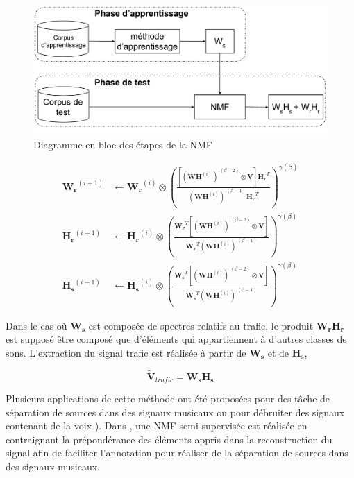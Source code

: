 \begin{figure}[t]
\centering
\includegraphics[width=.85\linewidth]{./figures/NMF/NMF_semi-supervised.pdf}
\caption{Diagramme en bloc des étapes de la NMF}
\label{fig:semi-supervised_learning}
\end{figure}

\begin{subequations}\label{eq:WH-SSupdate}
\begin{align}
\mathbf{W_r}^{(i+1)} &\leftarrow \mathbf{W_r}^{(i)}\otimes\left(\frac{\left[\left(\mathbf{WH}^{(i)} \right)^{.(\beta-2)}\otimes\mathbf{V} \right]\mathbf{H_r}^T}{\left(\mathbf{WH}^{(i)} \right)^{.(\beta-1)}\mathbf{H_r}^T}\right)^{\gamma(\beta)}\label{eq:W_r_SS}\\
\mathbf{H_r}^{(i+1)} &\leftarrow \mathbf{H_r}^{(i)}\otimes\left(\frac{\mathbf{W_r}^T \left[\left(\mathbf{WH}^{(i)} \right)^{.(\beta-2)}\otimes\mathbf{V} \right]}{\mathbf{W_r}^T \left(\mathbf{WH}^{(i)} \right)^{.(\beta-1)}}\right)^{\gamma(\beta)}\label{eq:H_r_SS}\\
\mathbf{H_s}^{(i+1)} &\leftarrow \mathbf{H_s}^{(i)}\otimes\left(\frac{\mathbf{W_s}^T \left[\left(\mathbf{WH}^{(i)} \right)^{.(\beta-2)}\otimes\mathbf{V} \right]}{\mathbf{W_s}^T \left(\mathbf{WH}^{(i)} \right)^{.(\beta-1)}}\right)^{\gamma(\beta)}\label{eq:H_s_SS}
\end{align}
\end{subequations}

Dans le cas où $\mathbf{W_s}$ est composée de spectres relatifs au trafic, le produit $\mathbf{W_r} \mathbf{H_r}$ est supposé être composé que d'éléments qui appartiennent à d'autres classes de sons. L'extraction du signal trafic est réalisée à partir de $\mathbf{W_s}$ et de $\mathbf{H_s}$,

\begin{equation}\label{eq:WSHs_trafic}
\mathbf{\tilde{V}}_{trafic} = \mathbf{W_s H_s}
\end{equation}

Plusieurs applications de cette méthode ont été proposées pour des tâche de séparation de sources dans des signaux musicaux \cite{smaragdis2007supervised} ou pour débruiter des signaux contenant de la voix \cite{mysore2011non, duan2012online}). Dans \cite{lefevre2012semi}, une NMF semi-supervisée est réalisée en contraignant la prépondérance des éléments appris dans la reconstruction du signal afin de faciliter l'annotation pour réaliser de la séparation de sources dans des signaux musicaux.


